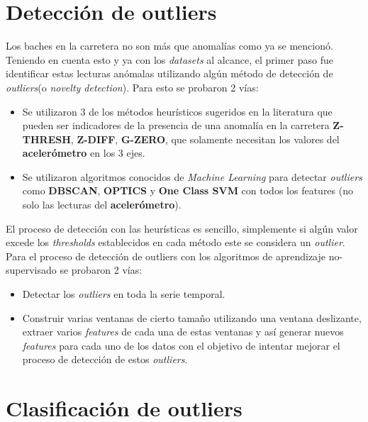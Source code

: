 \section{Detección de outliers}
	Los baches en la carretera no son más que anomalías como ya se mencionó. Teniendo en cuenta esto y ya con los \emph
	{datasets} al alcance, el primer paso fue identificar estas lecturas anómalas utilizando algún método de detección de \emph
	{outliers}(o \emph{novelty detection}). Para esto se probaron 2 vías:\\

	\begin{itemize}
		\item Se utilizaron 3 de los métodos heurísticos sugeridos en la literatura que pueden ser indicadores de la presencia de una
			anomalía en la carretera \textbf{Z-THRESH}, \textbf{Z-DIFF}, \textbf{G-ZERO}, que solamente necesitan los valores
			del \textbf{acelerómetro} en los 3 ejes.
		\item Se utilizaron algoritmos conocidos de \emph{Machine Learning} para detectar \emph{outliers} como \textbf{DBSCAN},
			\textbf{OPTICS} y \textbf{One Class SVM} con todos los features (no solo las lecturas del \textbf{acelerómetro}).
	\end{itemize}

	El proceso de detección con las heurísticas es sencillo, simplemente si algún valor excede los \emph{thresholds} establecidos en 
	cada método este se considera un \emph{outlier}. Para el proceso de detección de outliers con los algoritmos de aprendizaje no-supervisado
	se probaron 2 vías: 

	\begin{itemize}
		\item Detectar los \emph{outliers} en toda la serie temporal.\\
		\item Construir varias ventanas de cierto tamaño utilizando una ventana deslizante, extraer varios \emph{features} de
			cada una de estas ventanas y así generar nuevos \emph {features} para cada uno de los datos con el objetivo de
			intentar mejorar el proceso de detección de estos \emph{outliers}.\\
	\end{itemize}
	

\section{Clasificación de outliers}


